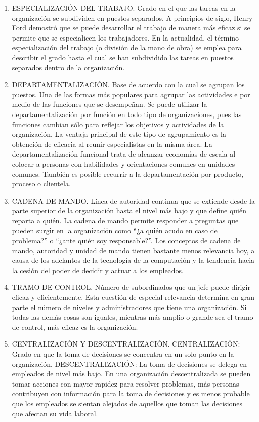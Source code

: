 \documentclass[
]{krantz}
\providecommand{\tightlist}{%
  \setlength{\itemsep}{0pt}\setlength{\parskip}{0pt}}
\begin{document}
\begin{enumerate}
\def\labelenumi{\Roman{enumi}.}
\tightlist
\item
  ESPECIALIZACIÓN DEL TRABAJO. Grado en el que las tareas en la organización se subdividen en puestos separados. A principios de siglo, Henry Ford demostró que se puede desarrollar el trabajo de manera más eficaz si se permite que se especialicen los trabajadores. En la actualidad, el término especialización del trabajo (o división de la mano de obra) se emplea para describir el grado hasta el cual se han subdividido las tareas en puestos separados dentro de la organización.
\item
  DEPARTAMENTALIZACIÓN. Base de acuerdo con la cual se agrupan los puestos. Una de las formas más populares para agrupar las actividades e por medio de las funciones que se desempeñan. Se puede utilizar la departamentalización por función en todo tipo de organizaciones, pues las funciones cambian sólo para reflejar los objetivos y actividades de la organización. La ventaja principal de este tipo de agrupamiento es la obtención de eficacia al reunir especialistas en la misma área. La departamentalización funcional trata de alcanzar economías de escala al colocar a personas con habilidades y orientaciones comunes en unidades comunes. También es posible recurrir a la departamentación por producto, proceso o clientela.
\item
  CADENA DE MANDO. Línea de autoridad continua que se extiende desde la parte superior de la organización hasta el nivel más bajo y que define quién reparta a quién. La cadena de mando permite responder a preguntas que pueden surgir en la organización como ``¿a quién acudo en caso de problema?'' o ``¿ante quién soy responsable?''. Los conceptos de cadena de mando, autoridad y unidad de mando tienen bastante menos relevancia hoy, a causa de los adelantos de la tecnología de la computación y la tendencia hacia la cesión del poder de decidir y actuar a los empleados.
\item
  TRAMO DE CONTROL. Número de subordinados que un jefe puede dirigir eficaz y eficientemente. Esta cuestión de especial relevancia determina en gran parte el número de niveles y administradores que tiene una organización. Si todas las demás cosas son iguales, mientras más amplio o grande sea el tramo de control, más eficaz es la organización.
\item
  CENTRALIZACIÓN Y DESCENTRALIZACIÓN. CENTRALIZACIÓN: Grado en que la toma de decisiones se concentra en un solo punto en la organización. DESCENTRALIZACIÓN: La toma de decisiones se delega en empleados de nivel más bajo. En una organización descentralizada se pueden tomar acciones con mayor rapidez para resolver problemas, más personas contribuyen con información para la toma de decisiones y es menos probable que los empleados se sientan alejados de aquellos que toman las decisiones que afectan su vida laboral.

\end{enumerate}
\end{document}
